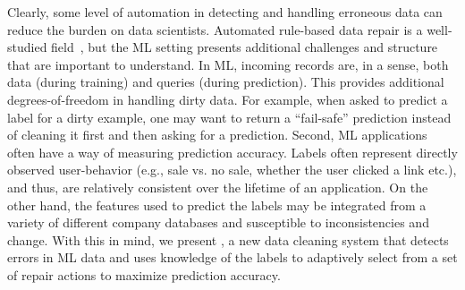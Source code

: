 
Clearly, some level of automation in detecting and handling erroneous data can reduce the burden on data scientists.
Automated rule-based data repair is a well-studied field~\cite{DBLP:conf/sigmod/ChuIKW16}, but the ML setting presents additional challenges and structure that are important to understand.
In ML, incoming records are, in a sense, both data (during training) and queries (during prediction).
This provides additional degrees-of-freedom in handling dirty data.
For example, when asked to predict a label for a dirty example, one may want to return a ``fail-safe'' prediction instead of cleaning it first and then asking for a prediction.
Second, ML applications often have a way of measuring prediction accuracy.
Labels often represent directly observed user-behavior (e.g., sale vs. no sale, whether the user clicked a link etc.), and thus, are relatively consistent over the lifetime of an application.
On the other hand, the features used to predict the labels may be integrated from a variety of different company databases and susceptible to inconsistencies and change.
With this in mind, we present \sys, a new data cleaning system that detects errors in ML data and uses knowledge of the labels to adaptively select from a set of repair actions to maximize prediction accuracy.
\fi